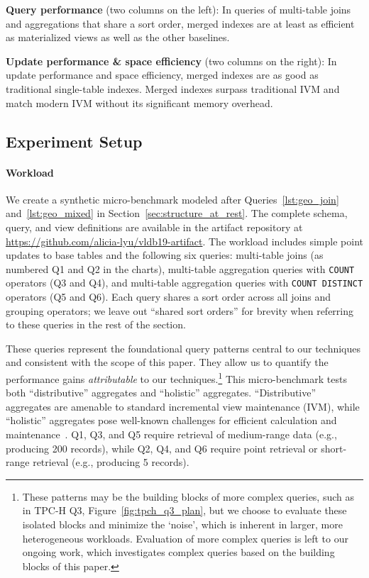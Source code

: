 \documentclass[sigconf, pdfa, nonacm]{acmart}
\newcommand\vldbavailabilityurl{https://github.com/alicia-lyu/vldb19-artifact}
\begin{document}
\textbf{Query performance} (two columns on the left): In queries of multi-table joins and aggregations that share a sort order, merged indexes are at least as efficient as materialized views as well as the other baselines.

\textbf{Update performance \& space efficiency} (two columns on the right): In update performance and space efficiency, merged indexes are as good as traditional single-table indexes. Merged indexes surpass traditional IVM and match modern IVM without its significant memory overhead.

\subsection{Experiment Setup}\label{subsec:setup}

\paragraph{Workload}

We create a synthetic micro-benchmark modeled after Queries~\ref{lst:geo_join} and~\ref{lst:geo_mixed} in Section~\ref{sec:structure_at_rest}.
The complete schema, query, and view definitions are available in the artifact repository at \url{\vldbavailabilityurl}.
The workload includes simple point updates to base tables and the following six queries: multi-table joins (as numbered Q1 and Q2 in the charts), multi-table aggregation queries with \texttt{COUNT} operators (Q3 and Q4), and multi-table aggregation queries with \texttt{COUNT DISTINCT} operators (Q5 and Q6). Each query shares a sort order across all joins and grouping operators; we leave out ``shared sort orders'' for brevity when referring to these queries in the rest of the section.

These queries represent the foundational query patterns central to our techniques and consistent with the scope of this paper.
They allow us to quantify the performance gains \textit{attributable} to our techniques.\footnote{These patterns may be the building blocks of more complex queries, such as in TPC-H Q3, Figure~\ref{fig:tpch_q3_plan}, but we choose to evaluate these isolated blocks and minimize the `noise', which is inherent in larger, more heterogeneous workloads. Evaluation of more complex queries is left to our ongoing work, which investigates complex queries based on the building blocks of this paper.
}
This micro-benchmark tests both ``distributive'' aggregates and ``holistic'' aggregates. ``Distributive'' aggregates are amenable to standard incremental view maintenance (IVM), while ``holistic'' aggregates pose well-known challenges for efficient calculation and maintenance~\cite{gray1996data}.
Q1, Q3, and Q5 require retrieval of medium-range data (e.g., producing 200 records), while Q2, Q4, and Q6 require point retrieval or short-range retrieval (e.g., producing 5 records).
\end{document}
